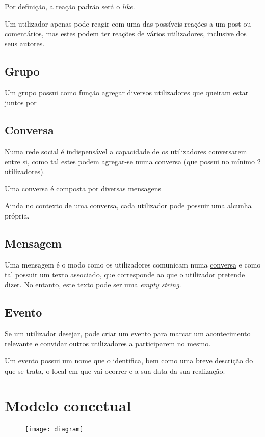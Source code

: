 \documentclass{report}
\begin{document}
Por definição, a reação padrão será o \textit{like}. \par

Um utilizador apenas pode reagir com uma das possíveis reações a um post ou comentários, mas estes podem ter reações de vários utilizadores, inclusive dos seus autores.

\section{Grupo}

Um grupo possui como função agregar diversos utilizadores que queiram estar juntos por

\section{Conversa}

Numa rede social é indispensável a capacidade de os utilizadores conversarem entre si, como tal estes podem agregar-se numa \underline{conversa} (que possui no mínimo 2 utilizadores). \par

Uma conversa é composta por diversas \underline{mensagens}

Ainda no contexto de uma conversa, cada utilizador pode possuir uma \underline{alcunha} própria.

\section{Mensagem}

Uma mensagem é o modo como os utilizadores comunicam numa \underline{conversa} e como tal possuir um \underline{texto} associado, que corresponde ao que o utilizador pretende dizer. No entanto, este \underline{texto} pode ser uma \textit{empty string}.

\section{Evento}

Se um utilizador desejar, pode criar um evento para marcar um acontecimento relevante e convidar outros utilizadores a participarem no mesmo. \par

Um evento possui um nome que o identifica, bem como uma breve descrição do que se trata, o local em que vai ocorrer e a sua data da sua realização.

\chapter{Modelo concetual}

\begin{figure}[h!]
    \centering
    \texttt{[image: diagram]}
\end{figure}
\end{document}
